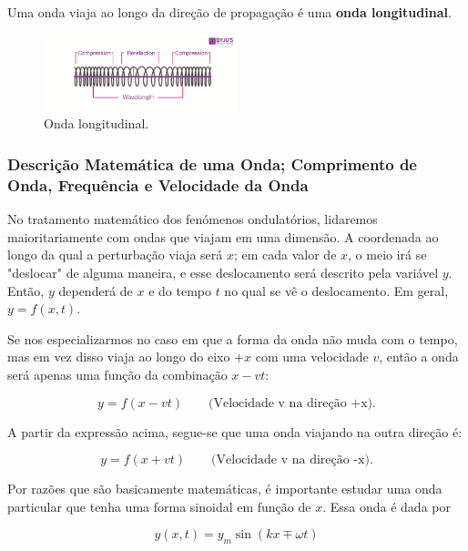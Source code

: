 Uma onda viaja ao longo da direção de propagação é uma \textbf{onda longitudinal}.

\begin{figure}[h!]
    \centering
    \includegraphics[width=0.5\textwidth]{11/fig/Longitudinal-Waves-1.png}
    \caption{Onda longitudinal.}
\end{figure}

\subsubsection{Descrição Matemática de uma Onda; Comprimento de Onda, Frequência e Velocidade da Onda}

No tratamento matemático dos fenómenos ondulatórios, lidaremos maioritariamente com ondas que viajam em uma dimensão. A coordenada ao longo da qual a perturbação viaja será $x$; em cada valor de $x$, o meio irá se "deslocar" de alguma maneira, e esse deslocamento será descrito pela variável $y$. Então, $y$ dependerá de $x$ e do tempo $t$ no qual se vê o deslocamento. Em geral, $y=f(x,t)$.

Se nos especializarmos no caso em que a forma da onda não muda com o tempo, mas em vez disso viaja ao longo do eixo $+x$ com uma velocidade $v$, então a onda será apenas uma função da combinação $x-vt$:

\begin{equation*}
    y=f(x-vt) \qquad \text{(Velocidade v na direção +x).}
\end{equation*}

A partir da expressão acima, segue-se que uma onda viajando na outra direção é:

\begin{equation*}
    y=f(x+vt) \qquad \text{(Velocidade v na direção -x).}
\end{equation*}

Por razões que são basicamente matemáticas, é importante estudar uma onda particular que tenha uma forma sinoidal em função de $x$. Essa onda é dada por

\begin{equation}\label{eq:onda-sin}
    y(x,t)=y_m\sin(kx\mp \omega t)
\end{equation}

